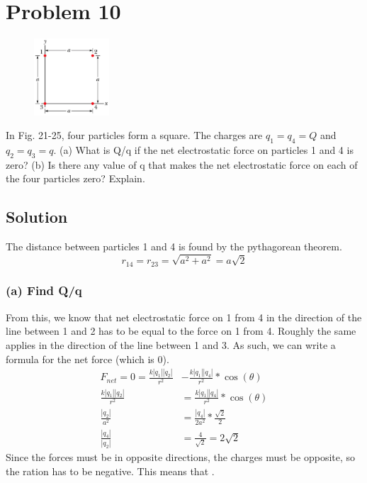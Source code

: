\documentclass[12pt]{article}
\begin{document}
\section{Problem 10}
\begin{figure}
    \vspace{-50pt}
    \includegraphics[width=0.25\textwidth,height=0.25\textwidth]{picture_4.png} 
\end{figure}
In Fig. 21-25, four particles form a square. The charges are $q_1 = q_4 = Q$ and $q_2 = q_3 = q$. (a) What is Q/q if the net electrostatic force on particles 1 and 4 is zero? (b) Is there any value of q that makes the net electrostatic force on each of the four particles zero? Explain.

\subsection{Solution}
The distance between particles 1 and 4 is found by the pythagorean theorem.
\[r_{14} = r_{23} = \sqrt{a^2 + a^2} = a\sqrt{2}\]

\subsubsection*{(a) Find Q/q}
From this, we know that net electrostatic force on 1 from 4 in the direction of the line between 1 and 2 has to be equal to the force on 1 from 4. Roughly the same applies in the direction of the line between 1 and 3. As such, we can write a formula for the net force (which is 0).
\begin{align*}
    F_{net} = 0 = \frac{k\left|q_1\right|\left|q_2\right|}{r^2} &- \frac{k\left|q_1\right|\left|q_4\right|}{r^2}*\cos(\theta)\\
    \frac{k\left|q_1\right|\left|q_2\right|}{r^2} &= \frac{k\left|q_1\right|\left|q_4\right|}{r^2}*\cos(\theta)\\
    \frac{\left|q_2\right|}{a^2} &= \frac{\left|q_4\right|}{2a^2}*\frac{\sqrt{2}}{2}\\
    \frac{\left|q_4\right|}{\left|q_2\right|} &= \frac{4}{\sqrt{2}} = 2\sqrt{2}
\end{align*}
Since the forces must be in opposite directions, the charges must be opposite, so the ration has to be negative. This means that .
\end{document}
